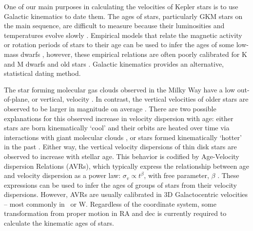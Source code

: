 One of our main purposes in calculating the velocities of Kepler stars is to
use Galactic kinematics to date them.
The ages of stars, particularly GKM stars on the main sequence, are difficult
to measure because their luminosities and temperatures evolve slowly
\citep[see][for a review of stellar ages]{soderblom2010}.
Empirical models that relate the magnetic activity or rotation periods of
stars to their age can be used to infer the ages of some low-mass dwarfs
\citep{citations}, however, these empirical relations are often poorly
calibrated for K and M dwarfs and old stars \citep{citations}.
Galactic kinematics provides an alternative, statistical dating method.

The star forming molecular gas clouds observed in the Milky Way have a low
out-of-plane, or vertical, velocity \citep[\eg][]{stark1989, stark2005,
aumer2009, martig2014, aumer2016}.
In contrast, the vertical velocities of older stars are observed to be larger
in magnitude on average \citep{stromberg1946, wielen1977, nordstrom2004,
holmberg2007, holmberg2009, aumer2009, casagrande2011, ting2019, yu2018}.
There are two possible explanations for this observed increase in velocity
dispersion with age: either stars are born kinematically `cool' and their
orbits are heated over time via interactions with giant molecular clouds
\citep[see][for a review of secular evolution in the MW]{sellwood2014}, or
stars formed kinematically `hotter' in the past \citep[\eg][]{bird2013}.
Either way, the vertical velocity dispersions of thin disk stars are observed
to increase with stellar age.
This behavior is codified by Age-Velocity dispersion Relations (AVRs), which
typically express the relationship between age and velocity dispersion as a
power law: $\sigma_v \propto t^\beta$, with free parameter, $\beta$
\citep[\eg][]{holmberg2009, yu2018}.
These expressions can be used to infer the ages of groups of stars from their
velocity dispersions.
However, AVRs are usually calibrated in 3D Galactocentric velocities -- most
commonly in \vz\ or W.
Regardless of the coordinate system, some transformation from proper motion in
RA and dec is currently required to calculate the kinematic ages of stars.

